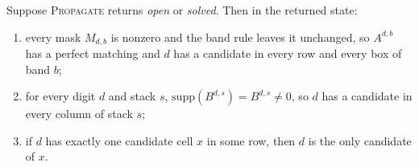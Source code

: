 \begin{lemma}
\label{lem:fixedpoint}
Suppose \textsc{Propagate} returns \emph{open} or \emph{solved}. Then in the returned state:
\begin{enumerate}
\item[(a)] every mask $M_{d,b}$ is nonzero and the band rule leaves it unchanged, so $A^{d,b}$ has a perfect matching
  and $d$ has a candidate in every row and every box of band $b$;
\item[(b)] for every digit $d$ and stack $s$, $\mathrm{supp}(B^{d,s})=B^{d,s}\neq 0$, so $d$ has a candidate in every
  column of stack $s$;
\item[(c)] if $d$ has exactly one candidate cell $x$ in some row, then $d$ is the only candidate of $x$.
\end{enumerate}
\end{lemma}

